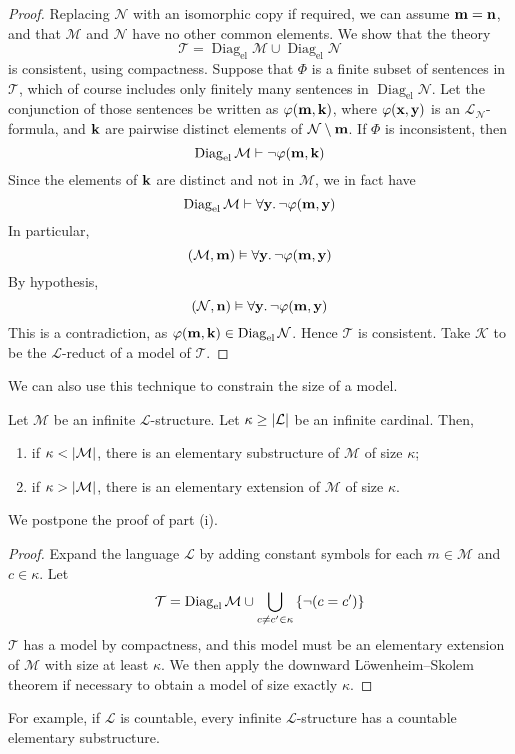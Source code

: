 \begin{proof}
    Replacing \( \mathcal N \) with an isomorphic copy if required, we can assume \( \vb m = \vb n \), and that \( \mathcal M \) and \( \mathcal N \) have no other common elements.
    We show that the theory
    \[ \mathcal T = \operatorname{Diag}_{\text{el}} \mathcal M \cup \operatorname{Diag}_{\text{el}} \mathcal N \]
    is consistent, using compactness.
    Suppose that \( \Phi \) is a finite subset of sentences in \( \mathcal T \), which of course includes only finitely many sentences in \( \operatorname{Diag}_{\text{el}} \mathcal N \).
    Let the conjunction of those sentences be written as \( \varphi(\vb m, \vb k) \), where \( \varphi(\vb x, \vb y) \) is an \( \mathcal L_{\mathcal N} \)-formula, and \( \vb k \) are pairwise distinct elements of \( \mathcal N \setminus \vb m \).
    If \( \Phi \) is inconsistent, then
    \[ \operatorname{Diag}_{\text{el}} \mathcal M \vdash \neg \varphi(\vb m, \vb k) \]
    Since the elements of \( \vb k \) are distinct and not in \( \mathcal M \), we in fact have
    \[ \operatorname{Diag}_{\text{el}} \mathcal M \vdash \forall \vb y.\, \neg \varphi(\vb m, \vb y) \]
    In particular,
    \[ (\mathcal M, \vb m) \vDash \forall \vb y.\, \neg \varphi(\vb m, \vb y) \]
    By hypothesis,
    \[ (\mathcal N, \vb n) \vDash \forall \vb y.\, \neg \varphi(\vb m, \vb y) \]
    This is a contradiction, as \( \varphi(\vb m, \vb k) \in \operatorname{Diag}_{\text{el}} \mathcal N \).
    Hence \( \mathcal T \) is consistent.
    Take \( \mathcal K \) to be the \( \mathcal L \)-reduct of a model of \( \mathcal T \).
\end{proof}
We can also use this technique to constrain the size of a model.
\begin{theorem}
    Let \( \mathcal M \) be an infinite \( \mathcal L \)-structure.
    Let \( \kappa \geq \abs{\mathcal L} \) be an infinite cardinal.
    Then,
    \begin{enumerate}
        \item if \( \kappa < \abs{\mathcal M} \), there is an elementary substructure of \( \mathcal M \) of size \( \kappa \);
        \item if \( \kappa > \abs{\mathcal M} \), there is an elementary extension of \( \mathcal M \) of size \( \kappa \).
    \end{enumerate}
\end{theorem}
We postpone the proof of part (i).
\begin{proof}
    Expand the language \( \mathcal L \) by adding constant symbols for each \( m \in \mathcal M \) and \( c \in \kappa \).
    Let
    \[ \mathcal T = \operatorname{Diag}_{\text{el}} \mathcal M \cup \bigcup_{c \neq c' \in \kappa} \qty{\neg(c = c')} \]
    \( \mathcal T \) has a model by compactness, and this model must be an elementary extension of \( \mathcal M \) with size at least \( \kappa \).
    We then apply the downward L\"owenheim--Skolem theorem if necessary to obtain a model of size exactly \( \kappa \).
\end{proof}
For example, if \( \mathcal L \) is countable, every infinite \( \mathcal L \)-structure has a countable elementary substructure.

